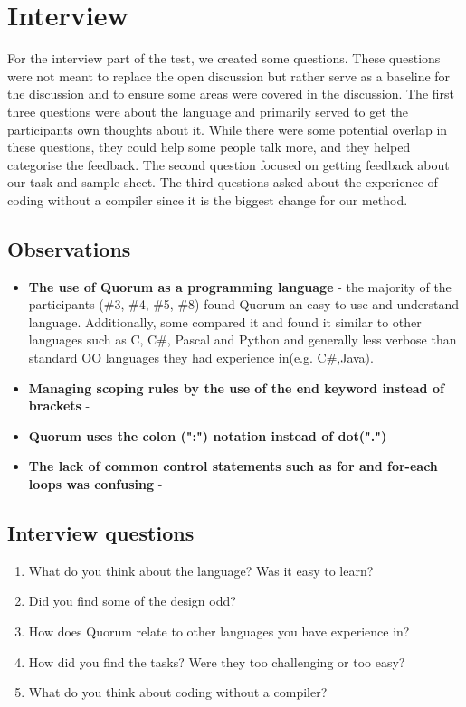 \section{Interview}
For the interview part of the test, we created some questions.
These questions were not meant to replace the open discussion but rather serve as a baseline for the discussion and to ensure some areas were covered in the discussion.
The first three questions were about the language and primarily served to get the participants own thoughts about it.
While there were some potential overlap in these questions, they could help some people talk more, and they helped categorise the feedback.
The second question focused on getting feedback about our task and sample sheet.
The third questions asked about the experience of coding without a compiler since it is the biggest change for our method.

\subsection{Observations}
\begin{itemize}
\item \textbf{The use of Quorum as a programming language} - the majority of the participants (\#3, \#4, \#5, \#8) found Quorum an easy to use and understand language. Additionally, some compared it and found it similar to other languages such as C, C\#, Pascal and Python and generally less verbose than standard OO languages they had experience in(e.g. C\#,Java). 
\item \textbf{Managing scoping rules by the use of the end keyword instead of brackets} - 
\item \textbf{Quorum uses the colon (":") notation instead of dot(".")}
\item \textbf{The lack of common control statements such as for and for-each loops was confusing} - 
\end{itemize}

\subsection{Interview questions}
\begin{enumerate}
\item What do you think about the language? Was it easy to learn?
\item Did you find some of the design odd?
\item How does Quorum relate to other languages you have experience in?
\item How did you find the tasks? Were they too challenging or too easy?
\item What do you think about coding without a compiler?
\end{enumerate}	
